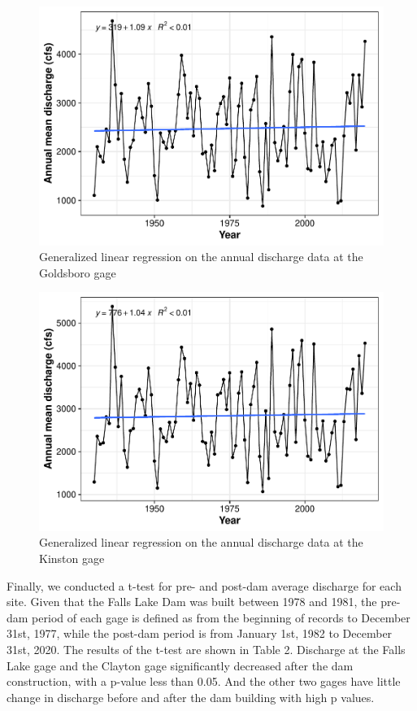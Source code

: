\documentclass[
  12pt,
]{article}
\begin{document}
\begin{figure}

\includegraphics{Gardner_Zeng_pdf_output_files/figure-latex/GLM Goldsboro-1} \hfill{}

\caption{Generalized linear regression on the annual discharge data at the Goldsboro gage}\label{fig:GLM Goldsboro}
\end{figure}

\begin{figure}

\includegraphics{Gardner_Zeng_pdf_output_files/figure-latex/GLM Kinston-1} \hfill{}

\caption{Generalized linear regression on the annual discharge data at the Kinston gage}\label{fig:GLM Kinston}
\end{figure}

Finally, we conducted a t-test for pre- and post-dam average discharge
for each site. Given that the Falls Lake Dam was built between 1978 and
1981, the pre-dam period of each gage is defined as from the beginning
of records to December 31st, 1977, while the post-dam period is from
January 1st, 1982 to December 31st, 2020. The results of the t-test are
shown in Table 2. Discharge at the Falls Lake gage and the Clayton gage
significantly decreased after the dam construction, with a p-value less
than 0.05. And the other two gages have little change in discharge
before and after the dam building with high p values.
\end{document}
